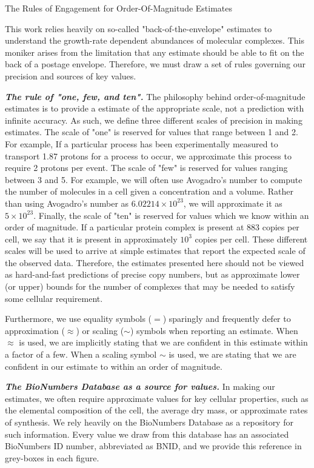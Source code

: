 \begin{featurebox}
\caption{The Rules of Engagement for Order-Of-Magnitude Estimates}
This work relies heavily on so-called "back-of-the-envelope" estimates to
understand the growth-rate dependent abundances of molecular
complexes. This moniker arises from the limitation that any estimate should be
able to fit on the back of a postage envelope. Therefore, we must draw a set of
rules governing our precision and sources of key values.

\textbf{\itshape The rule of "one, few, and ten".} The philosophy behind
order-of-magnitude estimates is to provide a estimate of the appropriate scale,
not a prediction with infinite accuracy. As such, we define three different
scales of precision in making estimates. The scale of "one" is reserved for
values that range between 1 and 2. For example, If a particular process has been
experimentally measured to transport 1.87 protons for a process to occur, we approximate
this process to require 2 protons per event. The scale of "few" is reserved for
values ranging between 3 and 5. For example, we will often use Avogadro's number
to compute the number of molecules in a cell given a concentration and a volume.
Rather than using Avogadro's number as $6.02214 \times 10^{23}$, we will
approximate it as $5 \times 10^{23}$. Finally, the scale of "ten" is reserved
for values which we know within an order of magnitude. If a particular protein
complex is present at 883 copies per cell, we say that it is present in
approximately $10^3$ copies per cell. These different scales will be used
to arrive at simple estimates that report the expected scale of the
observed data. Therefore, the estimates  presented here should not be viewed as
hard-and-fast predictions of precise copy numbers, but as approximate lower (or upper)
bounds for the number of complexes that may be needed to satisfy some cellular requirement.

Furthermore, we use equality symbols ($=$) sparingly and frequently defer to
approximation ($\approx$) or scaling ($\sim$) symbols when reporting an
estimate. When $\approx$ is used, we are implicitly stating that
we are confident in this estimate within a factor of a few. When a scaling
symbol $\sim$ is used, we are stating that we are confident in our estimate to
within an order of magnitude.

\textbf{\itshape The BioNumbers Database as a source for values.} In making our
estimates, we often require approximate values for key cellular properties, such
as the elemental composition of the cell, the average dry mass, or approximate
rates of synthesis. We rely heavily on the BioNumbers Database \citep{milo2010}
as a repository for such information. Every value we draw from this database has
an associated BioNumbers ID number, abbreviated as BNID, and we provide this
reference in grey-boxes in each  figure.



\end{featurebox}
